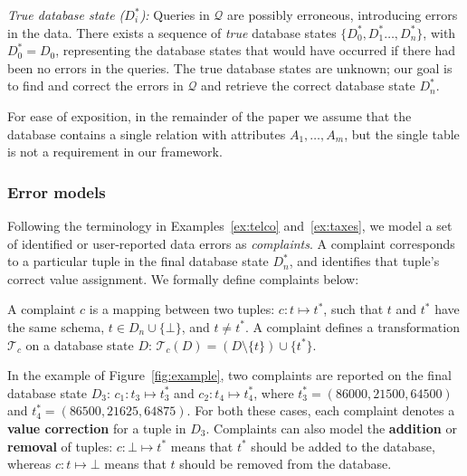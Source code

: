 \smallskip
\noindent
\emph{True database state ($D_i^*$):}
Queries in $\mathcal{Q}$ are possibly erroneous, introducing errors in the
data. There exists a sequence of \emph{true} database states $\{D_0^*,
D_1^*\dots, D_n^*\}$, with $D_0^*=D_0$, representing the database states that
would have occurred if there had been no errors in the queries.
The true database states are unknown; our goal is to find and correct the errors in $\mathcal{Q}$ and retrieve the correct database state $D_n^*$.

For ease of exposition, in the remainder of the paper we assume that the
database contains a single relation with attributes $A_1,\ldots,A_m$,
but the single table is not a requirement in our framework.


\subsubsection*{Error models}

Following the terminology in Examples~\ref{ex:telco}
and~\ref{ex:taxes}, we model a set of identified or user-reported
data errors as \emph{complaints}. A complaint corresponds to a
particular tuple in the final database state $D_n^*$, and identifies
that tuple's correct value assignment. We formally define complaints
below:

\begin{definition}[Complaint]
    A complaint $c$ is a mapping between two tuples: $c: t\mapsto t^*$, such that $t$ and $t^*$ have the same schema, $t\in D_n\cup\{\bot\}$, and $t\neq t^*$. A complaint defines a
    transformation $\mathcal{T}_c$ on a database state $D$: $\mathcal{T}_c(D)
    = (D\setminus\{t\})\cup\{t^*\}$.
\end{definition}

In the example of Figure~\ref{fig:example}, two complaints are reported on the final database state $D_3$: 
$c_1: t_3\mapsto t_3^*$ and
$c_2: t_4\mapsto t_4^*$, 
where $t_3^*=(86000,21500,64500)$ and $t_4^*=(86500,21625,64875)$. 
For both these cases, each complaint denotes a \textbf{value correction} for a tuple in $D_3$.  Complaints can also model the \textbf{addition} or \textbf{removal} of tuples: $c: \bot\mapsto t^*$ means that $t^*$ should be added to the database, whereas $c: t\mapsto \bot$
means that $t$ should be removed from the database.


